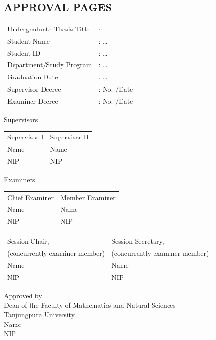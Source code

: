 \begin{singlespace}
\chapter*{APPROVAL PAGES}
\thispagestyle{empty}
\noindent
\begin{tabular}{@{}ll}
Undergraduate Thesis Title & : \dots \\
Student Name & : \dots \\
Student ID & : \dots \\
Department/Study Program & : \dots \\
Graduation Date & : \dots \\
Supervisor Decree & : No. \hspace{3cm} /Date \\
Examiner Decree & : No. \hspace{3cm} /Date \\
\end{tabular}\par
\vspace{0.5cm}
{\centering Supervisors \par}
\noindent
\begin{tabular}{@{}p{}p{}@{}}
\centering Supervisor I & \centering Supervisor II \tabularnewline[1.5cm]
\centering Name & \centering Name \tabularnewline
\centering NIP & \centering NIP \tabularnewline
\end{tabular}

\vspace{0.5cm}
{\centering Examiners \par}
\noindent
\begin{tabular}{@{}p{}p{}@{}}
\centering Chief Examiner & \centering Member Examiner \tabularnewline[1.5cm]
\centering Name & \centering Name \tabularnewline
\centering NIP & \centering NIP \tabularnewline
\end{tabular}

\vspace{0.5cm}
\noindent
\begin{tabular}{@{}p{}p{}@{}}
\centering Session Chair, & \centering Session Secretary, \tabularnewline
\centering (concurrently examiner member) & \centering (concurrently examiner member) \tabularnewline[1.5cm]
\centering Name & \centering Name \tabularnewline
\centering NIP & \centering NIP \tabularnewline
\end{tabular}

\vspace{0.5cm}
{\centering
Approved by \\
Dean of the Faculty of Mathematics and Natural Sciences \\
Tanjungpura University \\[1.5cm]
Name \\
NIP \par}
\end{singlespace}
